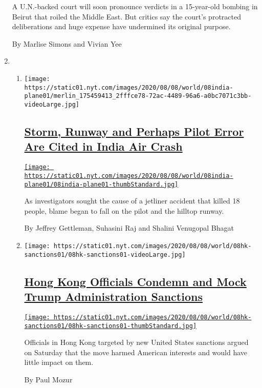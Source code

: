 \begin{enumerate}
  A U.N.-backed court will soon pronounce verdicts in a 15-year-old
  bombing in Beirut that roiled the Middle East. But critics say the
  court's protracted deliberations and huge expense have undermined its
  original purpose.

  By Marlise Simons and Vivian Yee
\item
  \begin{enumerate}
  \def\labelenumii{\arabic{enumii}.}
  \item
    \texttt{[image: https://static01.nyt.com/images/2020/08/08/world/08india-plane01/merlin\_175459413\_2fffce78-72ac-4489-96a6-a0bc7071c3bb-videoLarge.jpg]}

    \hypertarget{storm-runway-and-perhaps-pilot-error-are-cited-in-india-air-crash}{%
    \subsection{\texorpdfstring{\href{/2020/08/08/world/asia/india-plane-crash-dubai.html}{Storm,
    Runway and Perhaps Pilot Error Are Cited in India Air
    Crash}}{Storm, Runway and Perhaps Pilot Error Are Cited in India Air Crash}}\label{storm-runway-and-perhaps-pilot-error-are-cited-in-india-air-crash}}

    \href{/2020/08/08/world/asia/india-plane-crash-dubai.html}{\texttt{[image: https://static01.nyt.com/images/2020/08/08/world/08india-plane01/08india-plane01-thumbStandard.jpg]}}

    As investigators sought the cause of a jetliner accident that killed
    18 people, blame began to fall on the pilot and the hilltop runway.

    By Jeffrey Gettleman, Suhasini Raj and Shalini Venugopal Bhagat
  \item
    \texttt{[image: https://static01.nyt.com/images/2020/08/08/world/08hk-sanctions01/08hk-sanctions01-videoLarge.jpg]}

    \hypertarget{hong-kong-officials-condemn-and-mock-trump-administration-sanctions}{%
    \subsection{\texorpdfstring{\href{/2020/08/08/world/asia/hong-kong-sanctions-united-states.html}{Hong
    Kong Officials Condemn and Mock Trump Administration
    Sanctions}}{Hong Kong Officials Condemn and Mock Trump Administration Sanctions}}\label{hong-kong-officials-condemn-and-mock-trump-administration-sanctions}}

    \href{/2020/08/08/world/asia/hong-kong-sanctions-united-states.html}{\texttt{[image: https://static01.nyt.com/images/2020/08/08/world/08hk-sanctions01/08hk-sanctions01-thumbStandard.jpg]}}

    Officials in Hong Kong targeted by new United States sanctions
    argued on Saturday that the move harmed American interests and would
    have little impact on them.

    By Paul Mozur
  \end{enumerate}
\end{enumerate}

